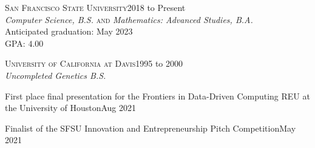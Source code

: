 \documentclass[hidelinks, 10pt]{article}
\begin{document}

{\centering

\hrulefill

\vspace{5mm}

\begin{minipage}[ct]{0.9\linewidth}
{\textsc{San Francisco State University}}\hfill 2018 to Present\\
\emph{Computer Science, B.S.} \textsc{and} \emph{Mathematics: Advanced Studies, B.A.}\\
Anticipated graduation: May 2023\\
GPA: $4.00$
\end{minipage}

\vspace{4mm}

\begin{minipage}[ct]{0.9\linewidth}
{\textsc{University of California at Davis}}\hfill 1995 to 2000\\
\emph{Uncompleted Genetics B.S.}
\end{minipage}

\vspace{6mm}

{\centering

\hrulefill

\vspace{5mm}

\begin{minipage}[ct]{0.9\linewidth}
First place final presentation for the Frontiers in Data-Driven Computing REU at
the University of Houston\hfill Aug 2021

\vspace{1.5mm}

Finalist of the SFSU Innovation and Entrepreneurship Pitch Competition\hfill May 2021

\vspace{1.5mm}


\end{minipage}}}
\end{document}
